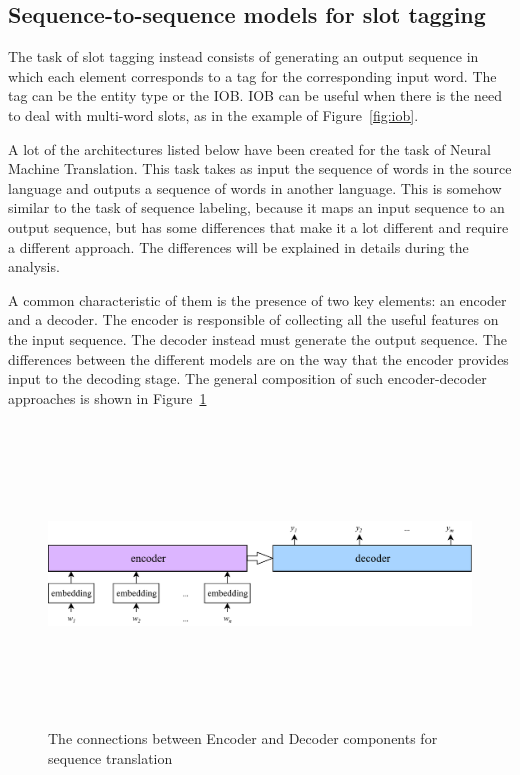 \subsection{Sequence-to-sequence models for slot tagging}
\label{soaSeq2Seq}

The task of slot tagging instead consists of generating an output sequence in which each element corresponds to a tag for the corresponding input word. The tag can be the entity type or the IOB. IOB can be useful when there is the need to deal with multi-word slots, as in the example of Figure~\ref{fig:iob}.

A lot of the architectures listed below have been created for the task of Neural Machine Translation. This task takes as input the sequence of words in the source language and outputs a sequence of words in another language. This is somehow similar to the task of sequence labeling, because it maps an input sequence to an output sequence, but has some differences that make it a lot different and require a different approach. The differences will be explained in details during the analysis.

A common characteristic of them is the presence of two key elements: an encoder and a decoder. The encoder is responsible of collecting all the useful features on the input sequence. The decoder instead must generate the output sequence. The differences between the different models are on the way that the encoder provides input to the decoding stage. The general composition of such encoder-decoder approaches is shown in Figure~\ref{fig:encoderDecoder}


\begin{figure}[!htbp]
    \centering
    \includegraphics[max width=\linewidth,max height=8cm,keepaspectratio]{figures/encoderDecoder}
    \caption{The connections between Encoder and Decoder components for sequence translation}\label{fig:encoderDecoder}
\end{figure}

